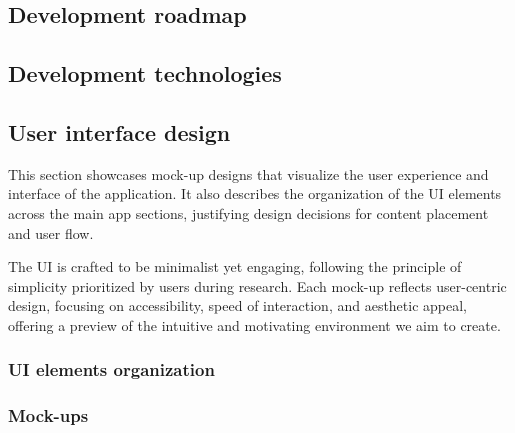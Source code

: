 \documentclass{article}
\begin{document}
\subsection{Development roadmap}


\subsection{Development technologies}


\subsection{User interface design}

This section showcases mock-up designs that visualize the user experience and interface of the application.
It also describes the organization of the UI elements across the main app sections, justifying design decisions for content placement and user flow.

The UI is crafted to be minimalist yet engaging, following the principle of simplicity prioritized by users during research.
Each mock-up reflects user-centric design, focusing on accessibility, speed of interaction, and aesthetic appeal, offering a preview of the intuitive and motivating environment we aim to create.

\subsubsection{UI elements organization}


\subsubsection{Mock-ups}


\end{document}
